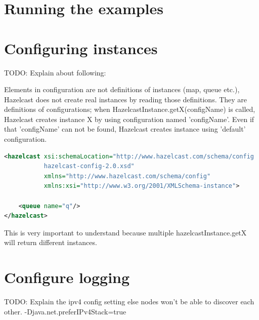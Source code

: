 \section{Running the examples}

\section{Configuring instances}

TODO: Explain about following:

Elements in configuration are not definitions of instances (map, queue etc.), Hazelcast does not create real instances by reading those definitions. They are definitions of configurations; when HazelcastInstance.getX(configName) is called, Hazelcast creates instance X by using configuration named 'configName'. Even if that 'configName' can not be found, Hazelcast creates instance using 'default' configuration. 

\begin{lstlisting}[language=xml]
<hazelcast xsi:schemaLocation="http://www.hazelcast.com/schema/config
           hazelcast-config-2.0.xsd"
           xmlns="http://www.hazelcast.com/schema/config"
           xmlns:xsi="http://www.w3.org/2001/XMLSchema-instance">

    <queue name="q"/>
</hazelcast>
\end{lstlisting}

This is very important to understand because multiple hazelcastInstance.getX will return different instances. 

\section{Configure logging}

TODO: Explain the ipv4 config setting else nodes won't be able to discover each other.
-Djava.net.preferIPv4Stack=true

